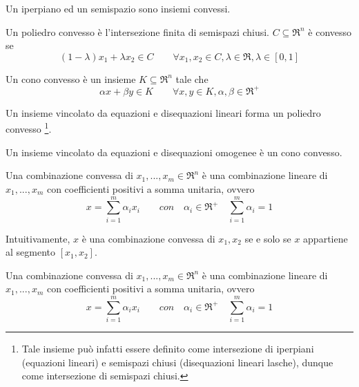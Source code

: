 Un iperpiano ed un semispazio sono insiemi convessi.

\begin{definition}
	\label{dfn:convex-polyhedron}
	Un poliedro convesso è l'intersezione finita di semispazi chiusi. $C\subseteq\Re^{n}$ è convesso se
	\begin{equation}
		\label{eqn:convex-polyhedron}
		(1-\lambda)x_{1}+\lambda x_{2} \in C \qquad \forall x_{1},x_{2}\in C,\lambda\in\Re,\lambda\in [0,1]
	\end{equation}
\end{definition}

\begin{definition}
	\label{dfn:convex-cono}
	Un cono convesso è un insieme $K\subseteq\Re^{n}$ tale che
	\begin{equation}
		\label{eqn:convex-cono}
		\alpha x + \beta y \in K \qquad \forall x,y\in K,\alpha,\beta\in\Re^{+}
	\end{equation}
\end{definition}

Un insieme vincolato da equazioni e disequazioni lineari forma un poliedro convesso
\footnote{Tale insieme può infatti essere definito come intersezione di iperpiani (equazioni lineari) e semispazi chiusi (disequazioni lineari lasche), dunque come intersezione di semispazi chiusi.}.

Un insieme vincolato da equazioni e disequazioni omogenee è un cono convesso.

\begin{definition}
	\label{dfn:convex-combination}
	Una combinazione convessa di $x_{1},...,x_{m} \in\Re^{n}$ è una combinazione lineare di $x_{1},...,x_{m}$ con coefficienti positivi a somma unitaria, ovvero
	\begin{equation}
		\label{eqn:convex-combination}
		x=\sum_{i=1}^{m}\alpha_{i}x_{i} \qquad con \quad \alpha_{i}\in\Re^{+} \quad \sum_{i=1}^{m}\alpha_{i}=1
	\end{equation}
\end{definition}

Intuitivamente, $x$ è una combinazione convessa di $x_{1},x_{2}$ se e solo se $x$ appartiene al segmento $[x_{1},x_{2}]$.

\begin{definition}
	\label{dfn:convex-involucro}
	Una combinazione convessa di $x_{1},...,x_{m} \in\Re^{n}$ è una combinazione lineare di $x_{1},...,x_{m}$ con coefficienti positivi a somma unitaria, ovvero
	\begin{equation}
		\label{eqn:convex-involucro}
		x=\sum_{i=1}^{m}\alpha_{i}x_{i} \qquad con \quad \alpha_{i}\in\Re^{+} \quad \sum_{i=1}^{m}\alpha_{i}=1
	\end{equation}
\end{definition}


